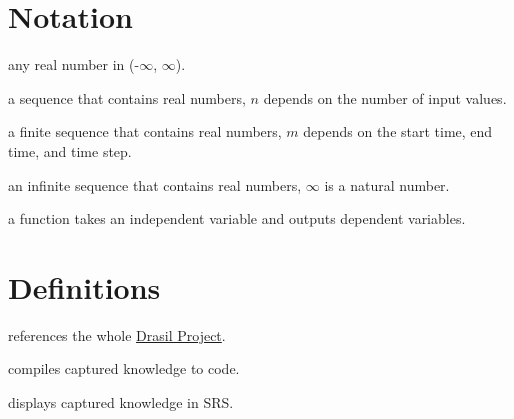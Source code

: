 
\section*{Notation}
\begin{description}[font=\rmfamily\bfseries, leftmargin=3.5cm, style=nextline]
	\item[$\mathbb{R}$] any real number in (-$\infty$, $\infty$).
	\item[$\mathbb{R}^n$] a sequence that contains real numbers, $n$ depends on the number of input values.
	\item[$\mathbb{R}^m$] a finite sequence that contains real numbers, $m$ depends on the start time, end time, and time step.
	\item[$\mathbb{R}^{\infty}$] an infinite sequence that contains real numbers, $\infty$ is a natural number.
	\item[$\mathbb{R} \rightarrow \mathbb{R}^k$] a function takes an independent variable and outputs dependent variables.
\end{description}

\section*{Definitions}
\begin{description}[font=\rmfamily\bfseries, leftmargin=5cm, style=nextline]
	\item[Drasil Framework] references the whole \href{https://jacquescarette.github.io/Drasil/}{Drasil Project}.
	\item[Drasil Code Generator] compiles captured knowledge to code.
	\item[Drasil Printer] displays captured knowledge in SRS.
\end{description}

